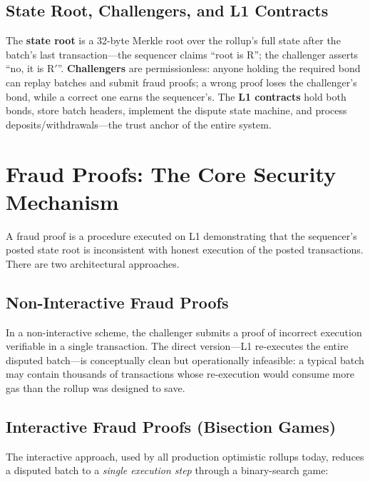 \documentclass[11pt,letterpaper]{article}
\begin{document}
\subsection{State Root, Challengers, and L1 Contracts}

The \textbf{state root} is a 32-byte Merkle root over the rollup's full state after the batch's last transaction---the sequencer claims ``root is R''; the challenger asserts ``no, it is R$'$''. \textbf{Challengers} are permissionless: anyone holding the required bond can replay batches and submit fraud proofs; a wrong proof loses the challenger's bond, while a correct one earns the sequencer's. The \textbf{L1 contracts} hold both bonds, store batch headers, implement the dispute state machine, and process deposits/withdrawals---the trust anchor of the entire system.

\section{Fraud Proofs: The Core Security Mechanism}

A fraud proof is a procedure executed on L1 demonstrating that the sequencer's posted state root is inconsistent with honest execution of the posted transactions. There are two architectural approaches.

\subsection{Non-Interactive Fraud Proofs}

In a non-interactive scheme, the challenger submits a proof of incorrect execution verifiable in a single transaction. The direct version---L1 re-executes the entire disputed batch---is conceptually clean but operationally infeasible: a typical batch may contain thousands of transactions whose re-execution would consume more gas than the rollup was designed to save.

\subsection{Interactive Fraud Proofs (Bisection Games)}

The interactive approach, used by all production optimistic rollups today, reduces a disputed batch to a \emph{single execution step} through a binary-search game:
\end{document}
